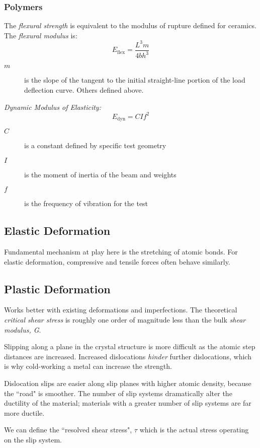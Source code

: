 \documentclass[10pt,letterpaper]{article}
\begin{document}
\subsubsection*{Polymers}
	The \textit{flexural strength} is equivalent to the modulus of rupture defined for ceramics.  The \textit{flexural modulus} is:
	$$
	E_{\text{flex}} = \frac{L^3 m}{4bh^3}
	$$
	\begin{description}
		\item[$m$] is the slope of the tangent to the initial straight-line portion of the load deflection curve.  Others defined above.
	\end{description}
	
	\emph{Dynamic Modulus of Elasticity:}
	$$
	E_{\text{dyn}} = CIf^2
	$$
	\begin{description}
		\item[$C$] is a constant defined by specific test geometry
		\item[$I$] is the moment of inertia of the beam and weights
		\item[$f$] is the frequency of vibration for the test
	\end{description}
	
	\subsection{Elastic Deformation}
	Fundamental mechanism at play here is the stretching of atomic bonds. For elastic deformation, compressive and tensile forces often behave similarly.  
	\subsection{Plastic Deformation}  
	Works better with existing deformations and imperfections. The theoretical \textit{critical shear stress} is roughly one order of magnitude less than the bulk \textit{shear modulus, G}. 
	
	Slipping along a plane in the crystal structure is more difficult as the atomic step distances are increased. Increased dislocations \textit{hinder} further dislocations, which is why cold-working a metal can increase the strength.
	 
	Dislocation slips are easier along slip planes with higher atomic density, because the ``road" is smoother.  The number of slip systems dramatically alter the ductility of the material; materials with a greater number of slip systems are far more ductile.  
	
	We can define the ``resolved shear stress", $\tau$ which is the actual stress operating on the slip system. 
	
\end{document}
